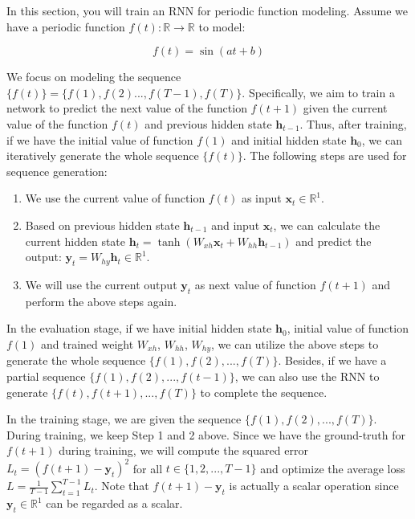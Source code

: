 \documentclass{article}
\newcommand{\R}{\mathbb{R}}
\newcommand{\x}{\mathbf{x}}
\newcommand{\h}{\mathbf{h}}
\newcommand{\y}{\mathbf{y}}
\begin{document}
\begin{probset}
\newpage

\begin{prob}
    In this section, you will train an RNN for periodic function modeling. Assume we have a periodic function $f(t) : \R \to \R$ to model:

    \[  f(t) = \sin(at + b) \]

    We focus on modeling the sequence $\{f(t)\} = \{f(1), f(2)..., f(T - 1), f(T)\}$. Specifically, we aim to train a network to predict the next value of the function $f(t + 1)$ given the current value of the function $f(t)$ and previous hidden state $\h_{t-1}$. Thus, after training, if we have the initial value of function $f(1)$ and initial hidden state $\h_0$, we can iteratively generate the whole sequence $\{f(t)\}$. The following steps are used for sequence generation:

    \begin{enumerate}
        \item We use the current value of function $f(t)$ as input $\x_t \in \R^1$.
        \item Based on previous hidden state $\h_{t-1}$ and input $\x_t$, we can calculate the current hidden state $\h_t = \tanh(W_{xh} \x_t + W_{hh} \h_{t-1})$ and predict the output: $\y_t = W_{hy} \h_t \in \R^1$.
        \item We will use the current output $\y_t$ as next value of function $f(t + 1)$ and perform the above steps again.
    \end{enumerate}

    In the evaluation stage, if we have initial hidden state $\h_0$, initial value of function $f(1)$ and trained weight $W_{xh}$, $W_{hh}$, $W_{hy}$, we can utilize the above steps to generate the whole sequence $\{f(1), f(2), ..., f(T)\}$. Besides, if we have a partial sequence $\{f(1), f(2), ..., f(t - 1)\}$, we can also use the RNN to generate $\{f(t), f(t + 1), ..., f(T)\}$ to complete the sequence.

    In the training stage, we are given the sequence $\{f(1), f(2), ..., f(T)\}$. During training, we keep Step 1 and 2 above. Since we have the ground-truth for $f(t + 1)$ during training, we will compute the squared error $L_t = (f(t + 1) - \y_t)^2$ for all $t \in \{1, 2, ..., T - 1\}$ and optimize the average loss $L = \frac{1}{T - 1} \sum_{t=1}^{T - 1} L_t$. Note that $f(t + 1) - \y_t$ is actually a scalar operation since $\y_t \in \R^1$ can be regarded as a scalar.


\end{prob}
\end{probset}
\end{document}

